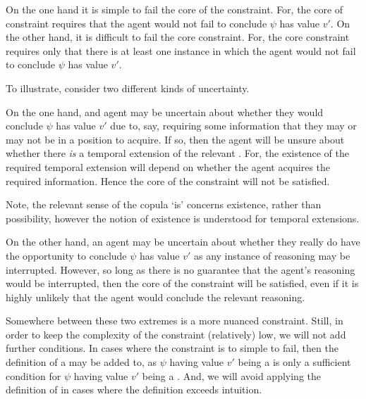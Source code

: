 \begin{note}[Delicacy]
  On the one hand it is simple to fail the core of the constraint.
  For, the core of constraint requires that the agent would not fail to conclude \(\psi\) has value \(v'\).
  On the other hand, it is difficult to fail the core constraint.
  For, the core constraint requires only that there is at least one instance in which the agent would not fail to conclude \(\psi\) has value \(v'\).

  To illustrate, consider two different kinds of uncertainty.

  On the one hand, and agent may be uncertain about whether they would conclude \(\psi\) has value \(v'\) due to, say, requiring some information that they may or may not be in a position to acquire.
  If so, then the agent will be unsure about whether there \emph{is} a temporal extension of the relevant \world{}.
  For, the existence of the required temporal extension will depend on whether the agent acquires the required information.
  Hence the core of the constraint will not be satisfied.

  Note, the relevant sense of the copula `is' concerns existence, rather than possibility, however the notion of existence is understood for temporal extensions.

  On the other hand, an agent may be uncertain about whether they really do have the opportunity to conclude \(\psi\) has value \(v'\) as any instance of reasoning may be interrupted.
  However, so long as there is no guarantee that the agent's reasoning would be interrupted, then the core of the constraint will be satisfied, even if it is highly unlikely that the agent would conclude the relevant reasoning.

  Somewhere between these two extremes is a more nuanced constraint.
  Still, in order to keep the complexity of the constraint (relatively) low, we will not add further conditions.
  In cases where the constraint is to simple to fail, then the definition of a \requ{} may be added to, as \(\psi\) having value \(v'\) being a \prequ{} is only a sufficient condition for \(\psi\) having value \(v'\) being a \requ{}.
  And, we will avoid applying the definition of \prequ{} in cases where the definition exceeds intuition.
\end{note}


